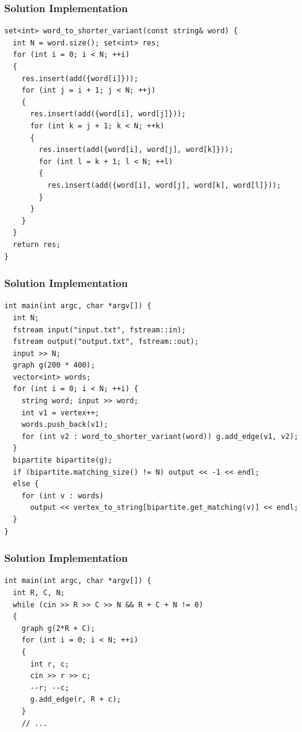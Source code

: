 \documentclass{beamer}
\newcommand{\uvalink}[2]{UVa Online Judge (http://uva.onlinejudge.org)
  problem number \href{#2}{\textcolor{blue}{#1}.}}
\newcounter{exo}
\newcommand{\exo}{
  \addtocounter{exo}{1}
  Exercice \arabic{exo}
}
\begin{document}
\begin{frame}[containsverbatim]
\frametitle{Solution Implementation}
\scriptsize

\begin{lstlisting}
set<int> word_to_shorter_variant(const string& word) {
  int N = word.size(); set<int> res;
  for (int i = 0; i < N; ++i)
  {
    res.insert(add({word[i]}));
    for (int j = i + 1; j < N; ++j)
    {
      res.insert(add({word[i], word[j]}));
      for (int k = j + 1; k < N; ++k)
      {
        res.insert(add({word[i], word[j], word[k]}));
        for (int l = k + 1; l < N; ++l)
        {
          res.insert(add({word[i], word[j], word[k], word[l]}));
        }
      }
    }
  }
  return res;
}
\end{lstlisting}

\end{frame}

\begin{frame}[containsverbatim]
\frametitle{Solution Implementation}
\scriptsize

\begin{lstlisting}
int main(int argc, char *argv[]) {
  int N;
  fstream input("input.txt", fstream::in);
  fstream output("output.txt", fstream::out);
  input >> N;
  graph g(200 * 400);
  vector<int> words;
  for (int i = 0; i < N; ++i) {
    string word; input >> word;
    int v1 = vertex++;
    words.push_back(v1);
    for (int v2 : word_to_shorter_variant(word)) g.add_edge(v1, v2);
  }
  bipartite bipartite(g);
  if (bipartite.matching_size() != N) output << -1 << endl;
  else {
    for (int v : words)
      output << vertex_to_string[bipartite.get_matching(v)] << endl;
  }
}
\end{lstlisting}

\end{frame}

\fi


\ifanswers

\begin{frame}[containsverbatim]
\frametitle{Solution Implementation}
\scriptsize

\begin{lstlisting}
int main(int argc, char *argv[]) {
  int R, C, N;
  while (cin >> R >> C >> N && R + C + N != 0)
  {
    graph g(2*R + C);
    for (int i = 0; i < N; ++i)
    {
      int r, c;
      cin >> r >> c;
      --r; --c;
      g.add_edge(r, R + c);
    }
    // ...
\end{lstlisting}

\end{frame}
\end{document}
